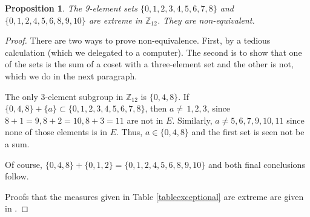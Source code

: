 \documentclass[letter,11pt]{amsart}
\numberwithin{theorem}{section}
\newtheorem{prop}[theorem]{Proposition}
\theoremstyle{remark}
\numberwithin{equation}{section}
\newcommand\Zp[2]{\texttt{$\mathbb Z_{#1}^{\	#2}$}}
\begin{document}
\begin{prop}\label{prop9in12} The 9-element sets
$\{0,1,2,3,4,5,6,7,8\}$ and \\$\{0,1,2,4,5,6,8,9,10\}$ are extreme in \Zp{12}{}. They are  non-equivalent. 
\end{prop}

\begin{proof}
There are two ways to prove non-equivalence. First, by  a tedious calculation (which we delegated to a computer). The second is to show that one of the sets is the sum
of a coset with a three-element set and the other is not, which we do in the next paragraph.


The only 3-element subgroup in \Zp{12}{} is $\{0,4,8\}$. If $\{0,4,8\}+\{a\} 
\subset\{0,1,2,3,4,5,6,7,8\}$, then $a\ne\, 1,2,3$,
 since $8+1=9,8+2=10, 8+3=11$ are 
  not in $E.$  Similarly,
   $a\ne 5,6,7,9,10,11$
 since none of those elements is in $E$. Thus, $a\in \{0,4,8\}$ and the first set is seen not be a sum.
 
 Of course, $\{0,4,8\}+\{0,1,2\}=\{0,1,2,4,5,6,8,9,10\}$ and both final conclusions follow.

Proofs that the measures given in Table \ref{tableexceptional} are extreme are given in
\cite{ABeastiaryAppendix}.
\end{proof}


\end{document}
